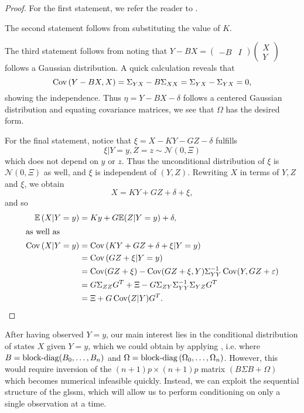 \begin{proof}
    For the first statement, we refer the reader to \citep[Chapter 4, Lemma 1]{Durbin2012Time}.
    
    The second statement follows from substituting the value of $K$. 
    
    The third statement follows from noting that $Y-BX = \begin{pmatrix}
        -B & I
    \end{pmatrix} \begin{pmatrix}
        X \\ Y
    \end{pmatrix}$ follows a Gaussian distribution. A quick calculation reveals that $$\operatorname{Cov} \left( Y- BX, X \right) = \Sigma_{YX} - B \Sigma_{XX} = \Sigma_{YX} - \Sigma_{YX} = 0,$$
    showing the independence. Thus $\eta = Y - BX - \delta$ follows a centered Gaussian distribution and equating covariance matrices, we see that $\Omega$ has the desired form.

    For the final statement, notice that $\xi = X - KY - GZ - \delta$ fulfills 
    $$
    \xi | Y = y, Z = z \sim \mathcal N(0, \Xi)
    $$
    which does not depend on $y$ or $z$. Thus the unconditional distribution of $\xi$ is $\mathcal N(0, \Xi)$ as well, and $\xi$ is independent of $(Y, Z)$. Rewriting $X$ in terms of $Y,Z$ and $\xi$, we obtain 
    $$
    X = KY + GZ + \delta + \xi,
    $$
    and so
    \begin{align*}
        \mathbb E \left( X | Y = y \right) &= Ky + G \mathbb E (Z| Y = y) + \delta,\\
        \intertext{as well as}
        \operatorname{Cov} \left( X | Y = y \right) &= \operatorname{Cov} \left(KY + GZ+\delta +\xi|  Y = y\right) \\
            &= \operatorname{Cov} \left( GZ + \xi | Y = y  \right) \\
            &= \operatorname{Cov} (GZ + \xi) - \operatorname{Cov}(GZ + \xi, Y) \Sigma_{YY}^{-1} \operatorname{Cov} (Y, GZ + \varepsilon)\\
            &= G \Sigma_{ZZ}G^{T} + \Xi - G \Sigma_{ZY}\Sigma_{YY}^{-1}\Sigma_{YZ}G^{T}\\
            &= \Xi + G \operatorname{Cov}(Z|Y) G^{T}.
    \end{align*}
\end{proof}

After having observed $Y = y$, our main interest lies in the conditional distribution of states $X$ given $Y= y$, which we could obtain by applying , i.e. where $B = \operatorname{block-diag} (B_{0}, \dots, B_{n})$ and $\Omega = \operatorname{block-diag} \left( \Omega_{0}, \dots, \Omega_{n} \right)$. However, this would require inversion of the $(n+1)p\times(n+1)p$ matrix $\left( B\Sigma B + \Omega \right)$ which becomes numerical infeasible quickly. Instead, we can exploit the sequential structure of the \acrshort{glssm}, which will allow us to perform conditioning on only a single observation at a time. 

